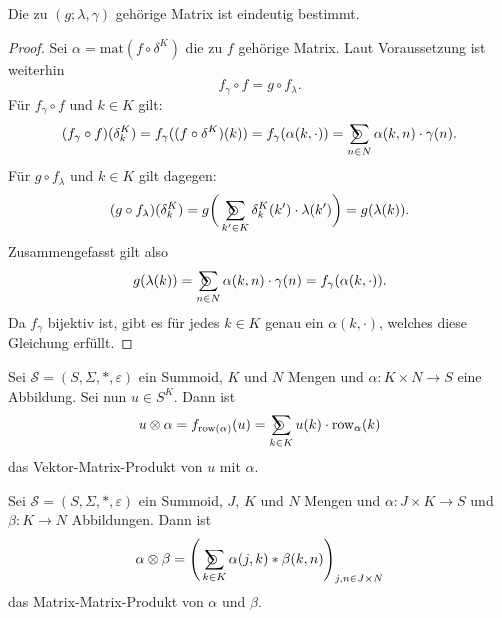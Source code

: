 \documentclass{article}
\DeclareMathOperator*{\sumcirc}{%
  \ThisStyle{\mathop{\ensurestackMath{\stackinset{c}{-1.5\LMpt}{c}{}{%
  \rotatebox[origin=lb]{-90}{$\SavedStyle\scalerel*{\bm\Circle}{%
  i}$}}{\SavedStyle\sum}}}}}
\begin{document}
\begin{theorem}
  Die zu $(g;\lambda, \gamma)$ gehörige Matrix ist eindeutig bestimmt.
\end{theorem}
\begin{proof}
  Sei $\alpha = \text{mat}(f \circ \delta^K)$ die zu $f$ gehörige Matrix.
  Laut Voraussetzung ist weiterhin
  \begin{equation*}
    f_\gamma \circ f = g \circ f_\lambda.
  \end{equation*}
  Für $f_\gamma \circ f$ und $k \in K$ gilt:
  \begin{equation*}
    (f_\gamma \circ f)(\delta^K_k)
    = f_\gamma((f \circ \delta^K)(k))
    = f_\gamma(\alpha(k, \cdot))
    = \sumcirc_{n \in N}\alpha(k, n) \cdot \gamma(n).
  \end{equation*}
  Für $g \circ f_\lambda$ und $k \in K$ gilt dagegen:
  \begin{equation*}
    (g \circ f_\lambda)(\delta^K_k)
    = g \bigg( \sumcirc_{k' \in K} \delta^K_k(k') \cdot \lambda(k') \bigg)
    = g(\lambda(k)).
  \end{equation*}
  Zusammengefasst gilt also
  \begin{equation*}
    g(\lambda(k)) = \sumcirc_{n \in N}\alpha(k, n) \cdot \gamma(n) = f_\gamma(\alpha(k, \cdot)).
  \end{equation*}
  Da $f_\gamma$ bijektiv ist, gibt es für jedes $k \in K$ genau ein $\alpha(k, \cdot)$,
  welches diese Gleichung erfüllt.
\end{proof}

\begin{definition}
  Sei $\mathcal{S} = (S, \Sigma, \ast, \varepsilon)$ ein Summoid, $K$ und $N$ Mengen und
  $\alpha \colon K \times N \to S$ eine Abbildung.
  Sei nun $u \in S^K$. Dann ist
  \begin{equation*}
    u \otimes \alpha = f_{\text{row}(\alpha)}(u) = \sumcirc_{k \in K}u(k) \cdot \text{row}_\alpha(k)
  \end{equation*}
  das Vektor-Matrix-Produkt von $u$ mit $\alpha$.
\end{definition}

\begin{definition}
  Sei $\mathcal{S} = (S, \Sigma, \ast, \varepsilon)$ ein Summoid, $J$, $K$ und $N$ Mengen und
  $\alpha \colon J \times K \to S$ und $\beta \colon K \to N$ Abbildungen.
  Dann ist
  \begin{equation*}
    \alpha \otimes \beta = \Bigg(\sumcirc_{k \in K} \alpha(j, k) \ast \beta(k, n) \Bigg)_{j, n \in J \times N}
  \end{equation*}
  das Matrix-Matrix-Produkt von $\alpha$ und $\beta$.
\end{definition}
\end{document}
